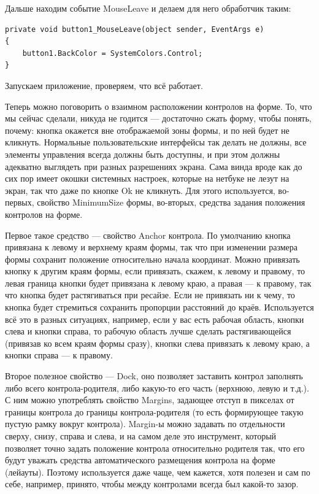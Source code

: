 \documentclass[a5paper]{article}
\begin{document}
Дальше находим событие MouseLeave и делаем для него обработчик таким:

\begin{verbatim}
private void button1_MouseLeave(object sender, EventArgs e)
{
    button1.BackColor = SystemColors.Control;
}
\end{verbatim}

Запускаем приложение, проверяем, что всё работает.

Теперь можно поговорить о взаимном расположении контролов на форме. То, что мы сейчас сделали, никуда не годится --- достаточно сжать форму, чтобы понять, почему: кнопка окажется вне отображаемой зоны формы, и по ней будет не кликнуть. Нормальные пользовательские интерфейсы так делать не должны, все элементы управления всегда должны быть доступны, и при этом должны адекватно выглядеть при разных разрешениях экрана. Сама винда вроде как до сих пор имеет окошки системных настроек, которые на нетбуке не лезут на экран, так что даже по кнопке Ok не кликнуть. Для этого используется, во-первых, свойство MinimumSize формы, во-вторых, средства задания положения контролов на форме. 

Первое такое средство --- свойство Anchor контрола. По умолчанию кнопка привязана к левому и верхнему краям формы, так что при изменении размера формы сохранит положение относительно начала координат. Можно привязать кнопку к другим краям формы, если привязать, скажем, к левому и правому, то левая граница кнопки будет привязана к левому краю, а правая --- к правому, так что кнопка будет растягиваться при ресайзе. Если не привязать ни к чему, то кнопка будет стремиться сохранить пропорции расстояний до краёв. Используется всё это в разных ситуациях, например, если у вас есть рабочая область, кнопки слева и кнопки справа, то рабочую область лучше сделать растягивающейся (привязав ко всем краям формы сразу), кнопки слева привязать к левому краю, а кнопки справа --- к правому.

Второе полезное свойство --- Dock, оно позволяет заставить контрол заполнять либо всего контрола-родителя, либо какую-то его часть (верхнюю, левую и т.д.). С ним можно употреблять свойство Margins, задающее отступ в пикселах от границы контрола до границы контрола-родителя (то есть формирующее такую пустую рамку вокруг контрола). Margin-ы можно задавать по отдельности сверху, снизу, справа и слева, и на самом деле это инструмент, который позволяет точно задать положение контрола относительно родителя так, что его будут уважать средства автоматического размещения контрола на форме (лейауты). Поэтому используется даже чаще, чем кажется, хотя полезен и сам по себе, например, принято, чтобы между контролами всегда был какой-то зазор.
\end{document}
